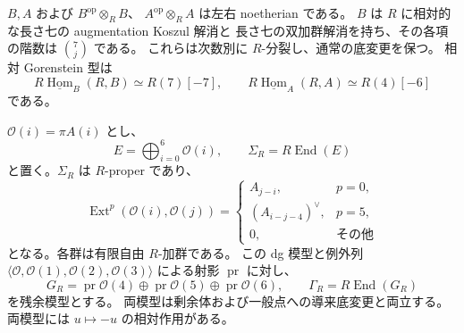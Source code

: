 \begin{proposition}
\label{mix:prop:h-semilocal-model}
$B,A$ および $B^{\mathrm{op}}\otimes_RB$、
$A^{\mathrm{op}}\otimes_RA$ は左右 noetherian である。
$B$ は $R$ に相対的な長さ七の augmentation Koszul 解消と
長さ七の双加群解消を持ち、その各項の階数は $\binom7j$ である。
これらは次数別に $R$-分裂し、通常の底変更を保つ。
相対 Gorenstein 型は
\[
 R\underline{\operatorname{Hom}}_B(R,B)\simeq R(7)[-7],
 \qquad
 R\underline{\operatorname{Hom}}_A(R,A)\simeq R(4)[-6]
\]
である。

$\mathcal O(i)=\pi A(i)$ とし、
\[
 E=\bigoplus_{i=0}^{6}\mathcal O(i),\qquad
 \Sigma_R=R\operatorname{End}(E)
\]
と置く。$\Sigma_R$ は $R$-proper であり、
\begin{equation}\label{mix:eq:h-local-line-hom}
 \operatorname{Ext}^p(\mathcal O(i),\mathcal O(j))=
 \begin{cases}
 A_{j-i},&p=0,\\
 (A_{i-j-4})^\vee,&p=5,\\
 0,&\text{その他}
 \end{cases}
\end{equation}
となる。各群は有限自由 $R$-加群である。
この dg 模型と例外列
$\langle\mathcal O,\mathcal O(1),\mathcal O(2),\mathcal O(3)\rangle$
による射影 $\operatorname{pr}$ に対し、
\[
 G_R=\operatorname{pr}\mathcal O(4)\oplus
     \operatorname{pr}\mathcal O(5)\oplus
     \operatorname{pr}\mathcal O(6),\qquad
 \Gamma_R=R\operatorname{End}(G_R)
\]
を残余模型とする。
両模型は剰余体および一般点への導来底変更と両立する。
両模型には $u\mapsto-u$ の相対作用がある。
\end{proposition}


